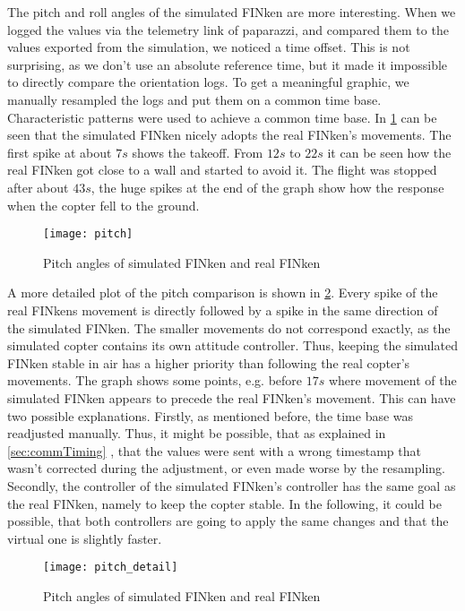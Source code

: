 The pitch and roll angles of the simulated FINken are more interesting.
When we logged the values via the telemetry link of paparazzi, and compared them to the values exported from the simulation, we noticed a time offset. 
This is not surprising, as we don't use an absolute reference time, but it made it impossible to directly compare the orientation logs.
To get a meaningful graphic, we manually resampled the logs and put them on a common time base.
Characteristic patterns were used to achieve a common time base.
In \ref{pic:pitchResponse} can be seen that the simulated FINken nicely adopts the real FINken's movements. 
The first spike at about $7s$ shows the takeoff. 
From $12s$ to $22s$ it can be seen how the real FINken got close to a wall and started to avoid it. 
The flight was stopped after about $43s$, the huge spikes at the end of the graph show how the response when the copter fell to the ground.
\begin{figure}
	\begin{center}
	\texttt{[image: pitch]}
	\caption{Pitch angles of simulated FINken and real FINken}
	\label{pic:pitchResponse}
	\end{center}
\end{figure}

A more detailed plot of the pitch comparison is shown in \ref{pic:pitchDetail}.
Every spike of the real FINkens movement is directly followed by a spike in the same direction of the simulated FINken.
The smaller movements do not correspond exactly, as the simulated copter contains its own attitude controller.
Thus, keeping the simulated FINken stable in air has a higher priority than following the real copter's movements.
The graph shows some points, e.g. before $17s$ where movement of the simulated FINken appears to precede the real FINken's movement.
This can have two possible explanations.
Firstly, as mentioned before, the time base was readjusted manually.
Thus, it might be possible, that as explained in \ref{sec:commTiming} , that the values were sent with a wrong timestamp that wasn't corrected during the adjustment, or even made worse by the resampling.
Secondly,  the controller of the simulated FINken's controller has the same goal as the real FINken, namely to keep the copter stable. 
In the following, it could be possible, that both controllers are going to apply the same changes and that the virtual one is slightly faster.
 

\begin{figure}
	\begin{center}
	\texttt{[image: pitch\_detail]}
	\caption{Pitch angles of simulated FINken and real FINken}
	\label{pic:pitchDetail}
	\end{center}
\end{figure}

